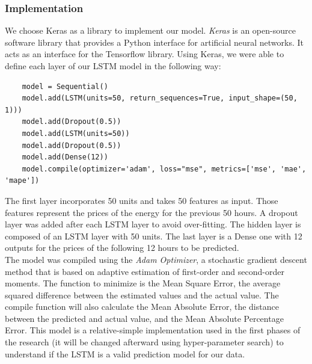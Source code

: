 \subsubsection{Implementation}
We choose Keras as a library to implement our model. \textit{Keras} is an open-source software library that provides a Python interface for artificial neural networks. It acts as an interface for the Tensorflow library.
Using Keras, we were able to define each layer of our LSTM model in the following way:

\begin{verbatim}
    model = Sequential()
    model.add(LSTM(units=50, return_sequences=True, input_shape=(50, 1)))
    model.add(Dropout(0.5))
    model.add(LSTM(units=50))
    model.add(Dropout(0.5))
    model.add(Dense(12))
    model.compile(optimizer='adam', loss="mse", metrics=['mse', 'mae', 'mape'])
\end{verbatim}

The first layer incorporates 50 units and takes 50 features as input. Those features represent the prices of the energy for the previous 50 hours. A dropout layer was added after each LSTM layer to avoid over-fitting. The hidden layer is composed of an LSTM layer with 50 units. The last layer is a Dense one with 12 outputs for the prices of the following 12 hours to be predicted. \\
The model was compiled using the \textit{Adam Optimizer}, a stochastic gradient descent method that is based on adaptive estimation of first-order and second-order moments. The function to minimize is the Mean Square Error, the average squared difference between the estimated values and the actual value. The compile function will also calculate the Mean Absolute Error, the distance between the predicted and actual value, and the Mean Absolute Percentage Error. This model is a relative-simple implementation used in the first phases of the research (it will be changed afterward using hyper-parameter search) to understand if the LSTM is a valid prediction model for our data.
